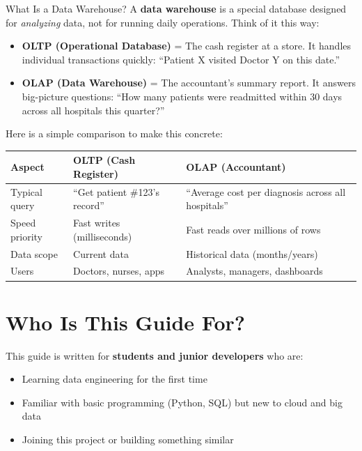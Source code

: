 \documentclass[12pt, a4paper, oneside]{report}
\begin{document}
\begin{conceptbox}{What Is a Data Warehouse?}
A \textbf{data warehouse} is a special database designed for \textit{analyzing} data, not for running daily operations. Think of it this way:

\begin{itemize}
    \item \textbf{OLTP (Operational Database)} = The cash register at a store. It handles individual transactions quickly: ``Patient X visited Doctor Y on this date.''
    \item \textbf{OLAP (Data Warehouse)} = The accountant's summary report. It answers big-picture questions: ``How many patients were readmitted within 30 days across all hospitals this quarter?''
\end{itemize}

Here is a simple comparison to make this concrete:

\begin{center}
\small
\begin{tabular}{p{3.5cm} p{5cm} p{5cm}}
    \toprule
    \textbf{Aspect} & \textbf{OLTP (Cash Register)} & \textbf{OLAP (Accountant)} \\
    \midrule
    Typical query & ``Get patient \#123's record'' & ``Average cost per diagnosis across all hospitals'' \\
    Speed priority & Fast writes (milliseconds) & Fast reads over millions of rows \\
    Data scope & Current data & Historical data (months/years) \\
    Users & Doctors, nurses, apps & Analysts, managers, dashboards \\
    \bottomrule
\end{tabular}
\end{center}
\end{conceptbox}

\section{Who Is This Guide For?}

This guide is written for \textbf{students and junior developers} who are:
\begin{itemize}
    \item Learning data engineering for the first time
    \item Familiar with basic programming (Python, SQL) but new to cloud and big data
    \item Joining this project or building something similar
\end{itemize}
\end{document}
